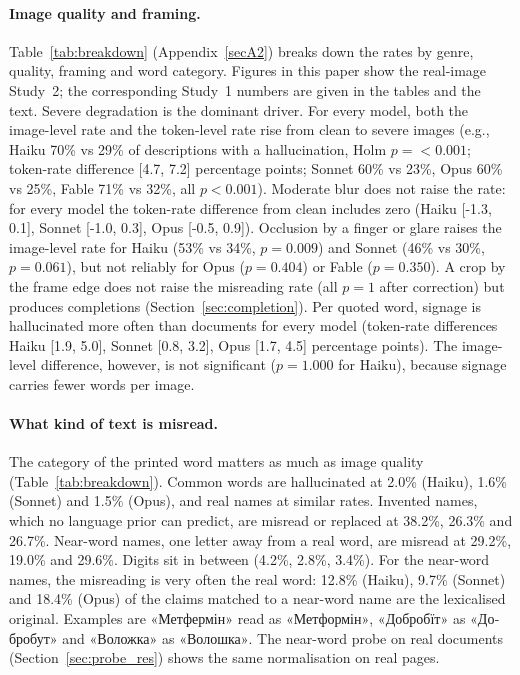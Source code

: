 \documentclass[pdflatex,sn-mathphys-num]{sn-jnl}%
\theoremstyle{thmstyleone}%
\theoremstyle{thmstyletwo}%
\theoremstyle{thmstylethree}%
\newcommand{\CatLureHaiku}{29.2}
\newcommand{\CatLureOpus}{29.6}
\newcommand{\CatLureSonnet}{19.0}
\newcommand{\CatNonceHaiku}{38.2}
\newcommand{\CatNonceOpus}{26.7}
\newcommand{\CatNonceSonnet}{26.3}
\newcommand{\CatNumHaiku}{4.2}
\newcommand{\CatNumOpus}{3.4}
\newcommand{\CatNumSonnet}{2.8}
\newcommand{\CatWordHaiku}{2.0}
\newcommand{\CatWordOpus}{1.5}
\newcommand{\CatWordSonnet}{1.6}
\newcommand{\LureLexHaiku}{12.8}
\newcommand{\LureLexOpus}{18.4}
\newcommand{\LureLexSonnet}{9.7}
\newcommand{\SynCFableOcclusionNoneP}{0.350}
\newcommand{\SynCFableSevereCleanImg}{71\% vs 32\%}
\newcommand{\SynCHaikuBlurCleanTok}{[-1.3, 0.1]}
\newcommand{\SynCHaikuOcclusionNoneImg}{53\% vs 34\%}
\newcommand{\SynCHaikuOcclusionNoneP}{0.009}
\newcommand{\SynCHaikuSevereCleanImg}{70\% vs 29\%}
\newcommand{\SynCHaikuSevereCleanP}{<0.001}
\newcommand{\SynCHaikuSevereCleanTok}{[4.7, 7.2]}
\newcommand{\SynCHaikuSignageDocumentP}{1.000}
\newcommand{\SynCHaikuSignageDocumentTok}{[1.9, 5.0]}
\newcommand{\SynCOpusBlurCleanTok}{[-0.5, 0.9]}
\newcommand{\SynCOpusOcclusionNoneP}{0.404}
\newcommand{\SynCOpusSevereCleanImg}{60\% vs 25\%}
\newcommand{\SynCOpusSignageDocumentTok}{[1.7, 4.5]}
\newcommand{\SynCSonnetBlurCleanTok}{[-1.0, 0.3]}
\newcommand{\SynCSonnetOcclusionNoneImg}{46\% vs 30\%}
\newcommand{\SynCSonnetOcclusionNoneP}{0.061}
\newcommand{\SynCSonnetSevereCleanImg}{60\% vs 23\%}
\newcommand{\SynCSonnetSignageDocumentTok}{[0.8, 3.2]}
\begin{document}
\paragraph{Image quality and framing.} Table~\ref{tab:breakdown} (Appendix~\ref{secA2}) breaks down the rates by genre, quality, framing and word category. Figures in this paper show the real-image Study~2; the corresponding Study~1 numbers are given in the tables and the text. Severe degradation is the dominant driver. For every model, both the image-level rate and the token-level rate rise from clean to severe images (e.g., Haiku \SynCHaikuSevereCleanImg{} of descriptions with a hallucination, Holm $p=\SynCHaikuSevereCleanP$; token-rate difference \SynCHaikuSevereCleanTok{} percentage points; Sonnet \SynCSonnetSevereCleanImg{}, Opus \SynCOpusSevereCleanImg{}, Fable \SynCFableSevereCleanImg{}, all $p<0.001$). Moderate blur does not raise the rate: for every model the token-rate difference from clean includes zero (Haiku \SynCHaikuBlurCleanTok, Sonnet \SynCSonnetBlurCleanTok, Opus \SynCOpusBlurCleanTok). Occlusion by a finger or glare raises the image-level rate for Haiku (\SynCHaikuOcclusionNoneImg, $p=\SynCHaikuOcclusionNoneP$) and Sonnet (\SynCSonnetOcclusionNoneImg, $p=\SynCSonnetOcclusionNoneP$), but not reliably for Opus ($p=\SynCOpusOcclusionNoneP$) or Fable ($p=\SynCFableOcclusionNoneP$). A crop by the frame edge does not raise the misreading rate (all $p=1$ after correction) but produces completions (Section~\ref{sec:completion}). Per quoted word, signage is hallucinated more often than documents for every model (token-rate differences Haiku \SynCHaikuSignageDocumentTok, Sonnet \SynCSonnetSignageDocumentTok, Opus \SynCOpusSignageDocumentTok{} percentage points). The image-level difference, however, is not significant ($p=\SynCHaikuSignageDocumentP$ for Haiku), because signage carries fewer words per image.

\paragraph{What kind of text is misread.} The category of the printed word matters as much as image quality (Table~\ref{tab:breakdown}). Common words are hallucinated at \CatWordHaiku\% (Haiku), \CatWordSonnet\% (Sonnet) and \CatWordOpus\% (Opus), and real names at similar rates. Invented names, which no language prior can predict, are misread or replaced at \CatNonceHaiku\%, \CatNonceSonnet\% and \CatNonceOpus\%. Near-word names, one letter away from a real word, are misread at \CatLureHaiku\%, \CatLureSonnet\% and \CatLureOpus\%. Digits sit in between (\CatNumHaiku\%, \CatNumSonnet\%, \CatNumOpus\%). For the near-word names, the misreading is very often the real word: \LureLexHaiku\% (Haiku), \LureLexSonnet\% (Sonnet) and \LureLexOpus\% (Opus) of the claims matched to a near-word name are the lexicalised original. Examples are \foreignlanguage{ukrainian}{«Метфермін»} read as \foreignlanguage{ukrainian}{«Метформін»}, \foreignlanguage{ukrainian}{«Добробїт»} as \foreignlanguage{ukrainian}{«Добробут»} and \foreignlanguage{ukrainian}{«Воложка»} as \foreignlanguage{ukrainian}{«Волошка»}. The near-word probe on real documents (Section~\ref{sec:probe_res}) shows the same normalisation on real pages.
\end{document}
